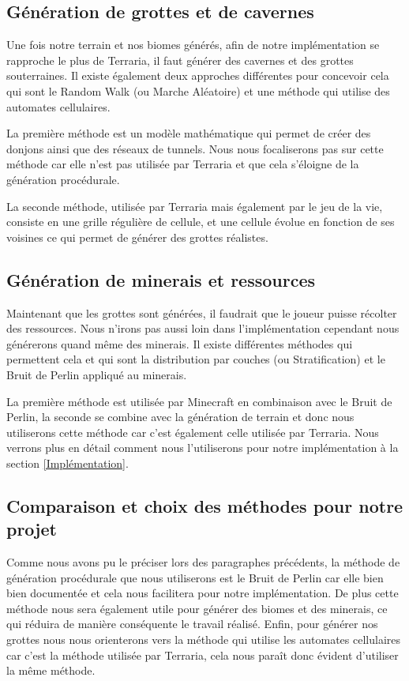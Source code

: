 \documentclass{article}
\begin{document}
\subsection{Génération de grottes et de cavernes}
Une fois notre terrain et nos biomes générés, afin de notre implémentation se rapproche le plus de Terraria, il faut générer des cavernes et des grottes souterraines. Il existe également deux approches différentes pour concevoir cela qui sont le Random Walk (ou Marche Aléatoire) et une méthode qui utilise des automates cellulaires.\par
La première méthode est un modèle mathématique qui permet de créer des donjons ainsi que des réseaux de tunnels. Nous nous focaliserons pas sur cette méthode car elle n'est pas utilisée par Terraria et que cela s'éloigne de la génération procédurale.\par 
La seconde méthode, utilisée par Terraria mais également par le jeu de la vie, consiste en une grille régulière de cellule, et une cellule évolue en fonction de ses voisines ce qui permet de générer des grottes réalistes.

\subsection{Génération de minerais et ressources}
Maintenant que les grottes sont générées, il faudrait que le joueur puisse récolter des ressources. Nous n'irons pas aussi loin dans l'implémentation cependant nous générerons quand même des minerais. Il existe différentes méthodes qui permettent cela et qui sont la distribution par couches (ou Stratification) et le Bruit de Perlin appliqué au minerais. \par
La première méthode est utilisée par Minecraft en combinaison avec le Bruit de Perlin, la seconde se combine avec la génération de terrain et donc nous utiliserons cette méthode car c'est également celle utilisée par Terraria. Nous verrons plus en détail comment nous l'utiliserons pour notre implémentation à la section \ref{Implémentation}.


\subsection{Comparaison et choix des méthodes pour notre projet}

Comme nous avons pu le préciser lors des paragraphes précédents, la méthode de génération procédurale que nous utiliserons est le Bruit de Perlin car elle bien bien documentée et cela nous facilitera pour notre implémentation. De plus cette méthode nous sera également utile pour générer des biomes et des minerais, ce qui réduira de manière conséquente le travail réalisé. Enfin, pour générer nos grottes nous nous orienterons vers la méthode qui utilise les automates cellulaires car c'est la méthode utilisée par Terraria, cela nous paraît donc évident d'utiliser la même méthode. 
\end{document}
